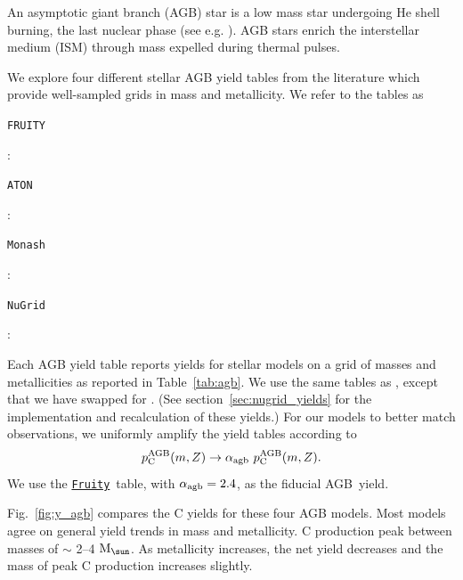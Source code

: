 \documentclass[fleqn,
referee, %
usenatbib]{mnras}
\newcommand{\fruity}{\texttt{\hyperlink{fruity}{Fruity}}}
\newcommand{\cfactor}{2.4}
\newcommand{\agb}{AGB}
\newcommand{\ycagb}{\y_{\rm C}^{\rm AGB}}
\newcommand{\y}{p}
\newcommand{\Mo}{ {\rm M}_{\sun}}
\begin{document}
An asymptotic giant branch (AGB) star is a low mass star undergoing He shell burning, the last nuclear phase (see e.g. \citealt{PR2023}). AGB stars enrich the interstellar medium (ISM) through mass expelled during thermal pulses. 


We explore four different stellar AGB yield tables from the literature which provide well-sampled grids in mass and metallicity. We refer to the tables as 
\begin{description}
    \item \hypertarget{fruity}{\texttt{FRUITY}}: \citet{cristallo+11, cristallo+15}
    \item \hypertarget{aton}{\texttt{ATON}}: \citet{ventura+13,ventura+14,ventura+18, ventura+20}
    \item \hypertarget{monash}{\texttt{Monash}}: \citet{KL16, karakas+18}
    \item \hypertarget{nugrid}{\texttt{NuGrid}}: \citet{pignatari+16, ritter+18, battino+19, battino+21}
\end{description}
Each AGB yield table reports yields for stellar models on a grid of masses and metallicities as reported in Table~\ref{tab:agb}.
We use the same tables as \citet{james+23}, except that we have swapped \citet{karakas10} for \citet{pignatari+16}. (See section~\ref{sec:nugrid_yields} for the implementation and recalculation of these yields.)
For our models to better match observations, we uniformly amplify the yield tables according to
\begin{equation} \label{eq:alpha}
        \ycagb(m, Z) \rightarrow \alpha_{\rm agb}\ \ycagb(m, Z).
\end{equation}
We use the \fruity\ table, with $\alpha_{\rm agb}=\cfactor$, as the fiducial \agb\ yield.

Fig.~\ref{fig:y_agb} compares the C yields for these four AGB models.
Most models agree on general yield trends in mass and metallicity.
C production peak between masses of $\sim$ 2--4 $\Mo$. As metallicity increases, the net yield decreases and the mass of peak C production increases slightly.
\end{document}
